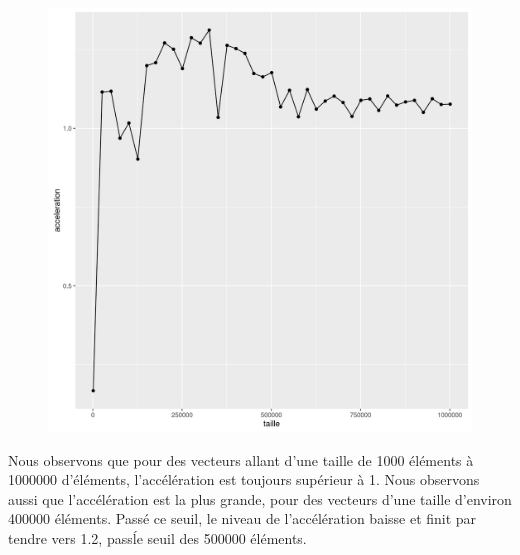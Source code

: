 \documentclass[a4paper,11pt]{scrartcl}
\begin{document}
\begin{figure}[H] \center
   \includegraphics[scale=0.5] {graphes/global_temps_machine_accel14.png}
\end{figure}

Nous observons que pour des vecteurs allant d'une taille de 1000 \'el\'ements \`a 1000000 d'\'el\'ements, l'acc\'el\'eration est toujours sup\'erieur \`a 1. Nous observons aussi que l'acc\'el\'eration est la plus grande, pour des vecteurs d'une taille d'environ 400000 \'el\'ements. Pass\'e ce seuil, le niveau de l'acc\'el\'eration baisse et finit par tendre vers 1.2, pass\' le seuil des 500000 \'el\'ements.   
\end{document}
